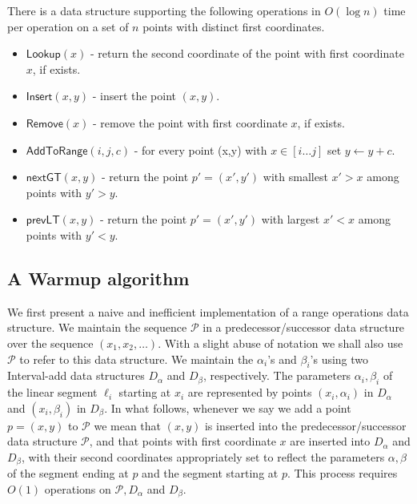 \documentclass[a4paper,UKenglish,cleveref, autoref, thm-restate]{lipics-v2021}
\newcommand{\AtR}{\mathsf{AddToRange}}
\newcommand{\assign}{\leftarrow}
\newcommand{\Insert}{\mathsf{Insert}}
\newcommand{\Remove}{\mathsf{Remove}}
\newcommand{\Lookup}{\mathsf{Lookup}}
\newcommand{\nextGT}{\mathsf{nextGT}}
\newcommand{\prevLT}{\mathsf{prevLT}}
\renewcommand{\P}{\mathcal{P}}
\begin{document}
\begin{lemma}\label{l:IntervalAdd}
    There is a data structure supporting the following operations in $O(\log n)$ time per operation on a set of $n$ points with distinct first coordinates.
    \begin{itemize}
         \item $\Lookup(x)$ - return the second coordinate of the point with first coordinate $x$, if exists.
        \item $\Insert(x,y)$ - insert the point $(x,y)$.
        \item $\Remove(x)$ - remove the point with first coordinate $x$, if exists.
        \item $\AtR(i,j,c)$ - for every point (x,y) with $x\in[i\ldots j]$ set $y\assign y+c$. 
        \item $\nextGT(x,y)$ -\! return the point $p'=(x',y')$ with smallest $x'>x$ among points with $y'>y$.
        \item $\prevLT(x,y)$ - return the point $p'=(x',y')$ with largest $x'<x$ among points with $y'<y$. 
    \end{itemize}
\end{lemma}

\subsection{A Warmup algorithm}\label{sec:warmup}
We first present a naive and inefficient implementation of a range operations data structure.  
We maintain the sequence $\P$ in a predecessor/successor data structure over the sequence $(x_1, x_2, \ldots)$. With a slight abuse of notation we shall also use $\P$ to refer to this data structure. We maintain the $\alpha_i$'s and $\beta_i$'s using two Interval-add data structures $D_{\alpha}$ and $D_\beta$, respectively. 
The parameters $\alpha_i, \beta_i$ of the linear segment $\ell_i$ starting at $x_i$ are represented by points $(x_i,\alpha_i)$ in $D_\alpha$ and $(x_i, \beta_i)$ in $D_\beta$. In what follows, whenever we say we add a point $p=(x,y)$ to $\P$ we mean that $(x,y)$ is inserted into the predecessor/successor data structure $\P$, and that points with first coordinate $x$ are inserted into $D_\alpha$ and $D_\beta$, with their second coordinates appropriately set to reflect the parameters $\alpha,\beta$ of the segment ending at $p$ and the segment starting at $p$. This process requires $O(1)$ operations on $\P,D_\alpha$ and $D_\beta$. 
 
\end{document}
